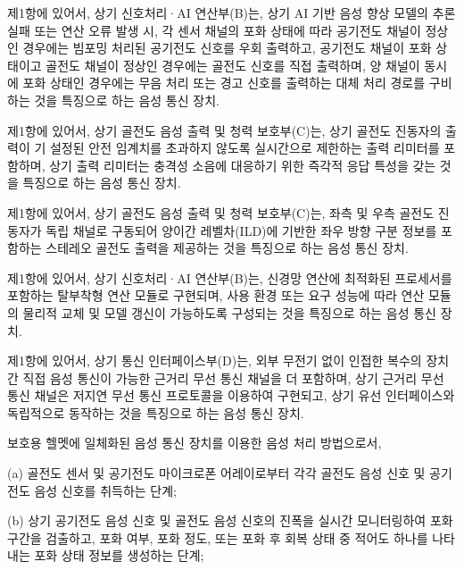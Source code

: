 \documentclass{article}
\DeclareRobustCommand{\codexedit}[1]{\textcolor{customorange}{#1}}
\DeclareRobustCommand{\vtwoedit}[1]{\textcolor{customgreen}{#1}}
\begin{document}
\begin{enumerate}[label=\textbf{[\arabic*]}]
    \item \codexedit{제1항에 있어서,
    상기 신호처리·AI 연산부(B)는, 상기 AI 기반 음성 향상 모델의 추론 실패 또는 연산 오류 발생 시, 각 센서 채널의 포화 상태에 따라
    공기전도 채널이 정상인 경우에는 빔포밍 처리된 공기전도 신호를 우회 출력하고,
    공기전도 채널이 포화 상태이고 골전도 채널이 정상인 경우에는 골전도 신호를 직접 출력하며,
    양 채널이 동시에 포화 상태인 경우에는 무음 처리 또는 경고 신호를 출력하는 대체 처리 경로를 구비하는 것을 특징으로 하는 음성 통신 장치.}

    \item 제1항에 있어서,
    상기 골전도 음성 출력 및 청력 보호부(C)는, 상기 골전도 진동자의 출력이 기 설정된 안전 임계치를 초과하지 않도록 실시간으로 제한하는 출력 리미터를 포함하며,
    상기 출력 리미터는 충격성 소음에 대응하기 위한 즉각적 응답 특성을 갖는 것을 특징으로 하는 음성 통신 장치.

    \item 제1항에 있어서,
    상기 골전도 음성 출력 및 청력 보호부(C)는, 좌측 및 우측 골전도 진동자가 독립 채널로 구동되어 양이간 레벨차(ILD)에 기반한 좌우 방향 구분 정보를 포함하는 스테레오 골전도 출력을 제공하는 것을 특징으로 하는 음성 통신 장치.

    \item 제1항에 있어서,
    상기 신호처리·AI 연산부(B)는, 신경망 연산에 최적화된 프로세서를 포함하는 탈부착형 연산 모듈로 구현되며, 사용 환경 또는 요구 성능에 따라 연산 모듈의 물리적 교체 및 모델 갱신이 가능하도록 구성되는 것을 특징으로 하는 음성 통신 장치.

    \item 제1항에 있어서,
    상기 통신 인터페이스부(D)는, 외부 무전기 없이 인접한 복수의 장치 간 직접 음성 통신이 가능한 근거리 무선 통신 채널을 더 포함하며,
    상기 근거리 무선 통신 채널은 저지연 무선 통신 프로토콜을 이용하여 구현되고, 상기 유선 인터페이스와 독립적으로 동작하는 것을 특징으로 하는 음성 통신 장치.


    \item 보호용 헬멧에 일체화된 음성 통신 장치를 이용한 음성 처리 방법으로서,

    (a) 골전도 센서 및 공기전도 마이크로폰 어레이로부터 각각 골전도 음성 신호 및 공기전도 음성 신호를 취득하는 단계;

    \vtwoedit{(b) 상기 공기전도 음성 신호 및 골전도 음성 신호의 진폭을 실시간 모니터링하여 포화 구간을 검출하고, 포화 여부, 포화 정도, 또는 포화 후 회복 상태 중 적어도 하나를 나타내는 포화 상태 정보를 생성하는 단계;}


\end{enumerate}
\end{document}
